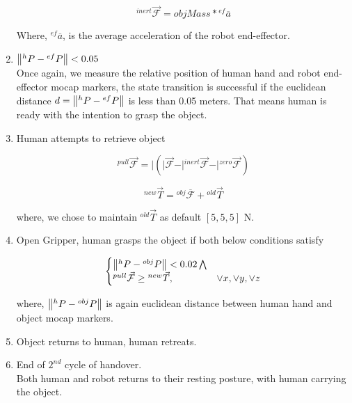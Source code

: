 \documentclass[a4paper, 12pt, oneside]{Thesis}  %
\begin{document}
\begin{enumerate}[start=0,label={\bf{t}\arabic*:}]
    \begin{equation}
        {}^{inert}\vec{\mathcal{F}}  = objMass * {}^{ef}\overline{a}
    \end{equation}

    Where, ${}^{ef}\overline{a}$, is the average acceleration of the robot end-effector.

    \item $\norm{{}^h{P} - {}^{ef}{P}} < 0.05$\\
    Once again, we measure the relative position of human hand and robot end-effector mocap markers, the state transition is successful if the euclidean distance $d = \norm{{}^h{P} - {}^{ef}{P}}$ is less than 0.05 meters. That means human is ready with the intention to grasp the object.
    
    \item Human attempts to retrieve object
    
    \begin{equation}
    {}^{pull}\vec{\mathcal{F}} = \vert{ (\vert{\vec{\mathcal{F}}} - \vert{{}^{inert}\vec{\mathcal{F}}} - \vert{{}^{zero}\vec{\mathcal{F}}}) }
    \end{equation}
    
    \begin{equation}
    {}^{new}\vec{T} = {}^{obj}\overline{\mathcal{F}} + {}^{old}\vec{T}
    \end{equation}
    
    where, we chose to maintain ${}^{old}\vec{T}$ as default $[5, 5, 5]$ N.
    
    \item Open Gripper, human grasps the object if both below conditions satisfy

    \begin{equation}
    \begin{cases}
     \norm{{}^h{P} - {}^{obj}{P}} < 0.02 \bigwedge  \\
     {}^{pull}\vec{\mathcal{F}}\geq {}^{new}\vec{T}, & \lor x, \lor y, \lor z
   \end{cases}
   \end{equation}

    where, $\norm{{}^h{P} - {}^{obj}{P}}$ is again euclidean distance between human hand and object mocap markers.

    \item Object returns to human, human retreats.
    
    \item End of $2^{nd}$ cycle of handover.\\
    Both human and robot returns to their resting posture, with human carrying the object.
\end{enumerate}
    
\end{document}

